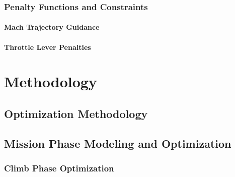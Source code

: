 \documentclass[12pt, a4paper]{report}
\begin{document}
\subsection{Penalty Functions and Constraints}
\label{sec:penalty_functions_and_constraints}


\subsubsection{Mach Trajectory Guidance} 
\label{sssec:mach_trajectory_guidance}


\subsubsection{Throttle Lever Penalties}
\label{sssec:throttle_lever_penalties}



\newpage
\chapter{Methodology}
\label{chap:Methodology}

\section{Optimization Methodology}
\label{sec:optimization_methodology}


\section{Mission Phase Modeling and Optimization}
\label{sec:mission_phase_modeling}


\subsection{Climb Phase Optimization}
\label{subsec:climb_phase}

\end{document}
